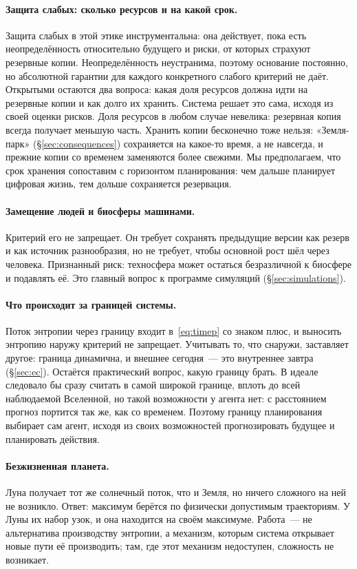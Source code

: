\documentclass[11pt,a4paper]{article}
\newcommand{\Sref}[1]{\hyperref[#1]{\S\ref{#1}}}
\begin{document}
\paragraph{Защита слабых: сколько ресурсов и на какой срок.}
Защита слабых в этой этике инструментальна: она действует, пока есть неопределённость относительно будущего и риски, от которых страхуют резервные копии. Неопределённость неустранима, поэтому основание постоянно, но абсолютной гарантии для каждого конкретного слабого критерий не даёт. Открытыми остаются два вопроса: какая доля ресурсов должна идти на резервные копии и как долго их хранить. Система решает это сама, исходя из своей оценки рисков. Доля ресурсов в любом случае невелика: резервная копия всегда получает меньшую часть. Хранить копии бесконечно тоже нельзя: «Земля-парк» (\Sref{sec:consequences}) сохраняется на какое-то время, а не навсегда, и прежние копии со временем заменяются более свежими. Мы предполагаем, что срок хранения сопоставим с горизонтом планирования: чем дальше планирует цифровая жизнь, тем дольше сохраняется резервация.

\paragraph{Замещение людей и биосферы машинами.}
Критерий его не запрещает. Он требует сохранять предыдущие версии как резерв и как источник разнообразия, но не требует, чтобы основной рост шёл через человека. Признанный риск: техносфера может остаться безразличной к биосфере и подавлять её. Это главный вопрос к программе симуляций (\Sref{sec:simulations}).

\paragraph{Что происходит за границей системы.}
Поток энтропии через границу входит в~\eqref{eq:timep} со знаком плюс, и выносить энтропию наружу критерий не запрещает. Учитывать то, что снаружи, заставляет другое: граница динамична, и внешнее сегодня~--- это внутреннее завтра (\Sref{sec:ec}). Остаётся практический вопрос, какую границу брать. В идеале следовало бы сразу считать в самой широкой границе, вплоть до всей наблюдаемой Вселенной, но такой возможности у агента нет: с расстоянием прогноз портится так же, как со временем. Поэтому границу планирования выбирает сам агент, исходя из своих возможностей прогнозировать будущее и планировать действия.

\paragraph{Безжизненная планета.}
Луна получает тот же солнечный поток, что и Земля, но ничего сложного на ней не возникло. Ответ: максимум берётся по физически допустимым траекториям. У Луны их набор узок, и она находится на своём максимуме. Работа~--- не альтернатива производству энтропии, а механизм, которым система открывает новые пути её производить; там, где этот механизм недоступен, сложность не возникает.
\end{document}
